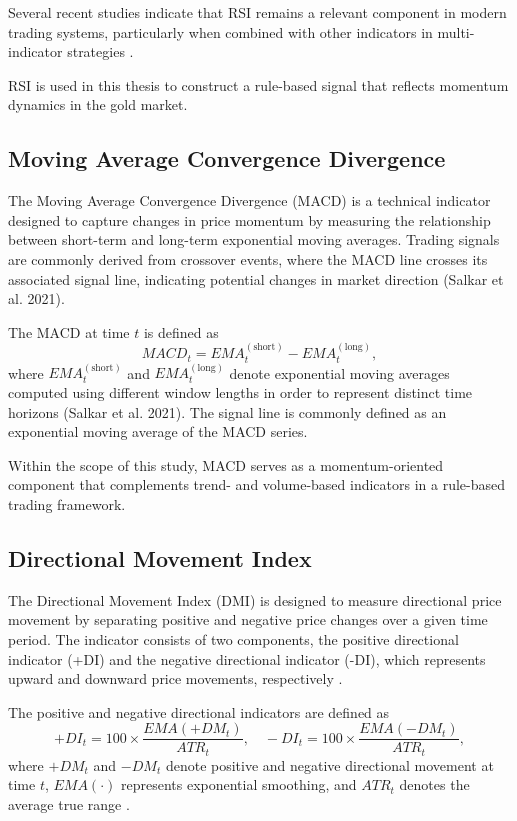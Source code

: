 Several recent studies indicate that RSI remains a relevant component in modern trading systems, particularly when combined with other indicators in multi-indicator strategies \citep{10795119}. 

RSI is used in this thesis to construct a rule-based signal that reflects momentum dynamics in the gold market.

\subsection{Moving Average Convergence Divergence}
The Moving Average Convergence Divergence (MACD) is a technical indicator
designed to capture changes in price momentum by measuring the relationship
between short-term and long-term exponential moving averages. Trading signals
are commonly derived from crossover events, where the MACD line crosses its
associated signal line, indicating potential changes in market direction
(Salkar et al. 2021).

The MACD at time $t$ is defined as
\[
MACD_t = EMA^{(\text{short})}_t - EMA^{(\text{long})}_t,
\]
where $EMA^{(\text{short})}_t$ and $EMA^{(\text{long})}_t$ denote exponential
moving averages computed using different window lengths in order to represent
distinct time horizons (Salkar et al. 2021). The signal line is commonly defined
as an exponential moving average of the MACD series.

Within the scope of this study, MACD serves as a momentum-oriented component
that complements trend- and volume-based indicators in a rule-based trading
framework.

\subsection{Directional Movement Index}

The Directional Movement Index (DMI) is designed to measure directional price movement by separating
positive and negative price changes over a given time period.
The indicator consists of two components, the positive directional indicator
(+DI) and the negative directional indicator (-DI), which represents upward and
downward price movements, respectively \citep{saud2024technical}.

The positive and negative directional indicators are defined as
\[
+DI_t = 100 \times \frac{EMA(+DM_t)}{ATR_t}, \quad
-DI_t = 100 \times \frac{EMA(-DM_t)}{ATR_t},
\]
where $+DM_t$ and $-DM_t$ denote positive and negative directional movement at
time $t$, $EMA(\cdot)$ represents exponential smoothing, and $ATR_t$ denotes
the average true range \citep{saud2024technical}.

